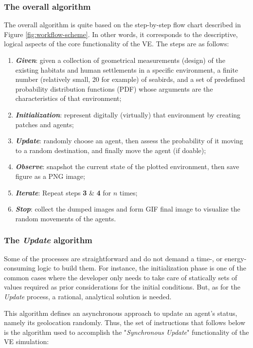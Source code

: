 \subsubsection{The overall algorithm}
The overall algorithm is quite based on the step-by-step flow chart described in Figure \ref{fig:workflow-scheme}. In other words, it corresponds to the descriptive, logical aspects of the core functionality of the VE. The steps are as follows:

\begin{enumerate}
    \item \textbf{\textit{Given}}: given a collection of geometrical measurements (design) of the existing habitats and human settlements in a specific environment, a finite number (relatively small, 20 for example) of seabirds, and a set of predefined probability distribution functions (PDF) whose arguments are the characteristics of that environment;
    \item \textbf{\textit{Initialization}}: represent digitally (virtually) that environment by creating patches and agents;
    \item \textbf{\textit{Update}}: randomly choose an agent, then assess the probability of it moving to a random destination, and finally move the agent (if doable);
    \item \textbf{\textit{Observe}}: snapshot the current state of the plotted environment, then save figure as a PNG image;
    \item \textbf{\textit{Iterate}}: Repeat steps \textbf{3} \& \textbf{4} for $n$ times;
    \item \textbf{\textit{Stop}}: collect the dumped images and form GIF final image to visualize the random movements of the agents.
\end{enumerate}

\subsubsection{The \emph{Update} algorithm}
Some of the processes are straightforward and do not demand a time-, or energy-consuming logic to build them. For instance, the initialization phase is one of the common cases where the developer only needs to take care of statically sets of values required as prior considerations for the initial conditions. But, as for the \emph{Update} process, a rational, analytical solution is needed.

This algorithm defines an asynchronous approach to update an agent's status, namely its geolocation randomly. Thus, the set of instructions that follows below is the algorithm used to accomplish the "\emph{Synchronous Update}" functionality of the VE simulation:

